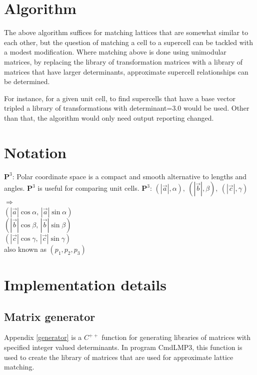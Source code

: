 \documentclass[preprint]{iucr}              %
\numberwithin{equation}{section}
\newcommand{\PIII}{\ensuremath{\mathbf{P}^{3}}}
\begin{document}
\section{Algorithm}

The above algorithm suffices for matching lattices that are somewhat
similar to each other, but the question of matching a cell to a supercell
can be tackled with a modest modification. Where matching above is
done using unimodular matrices, by replacing the library of transformation
matrices with a library  of matrices that have larger determinants, approximate
supercell relationships can be determined.

For instance, for a given unit cell, to find supercells that have 
a base vector tripled a library of transformations with 
determinant=3.0 would be used. Other than that, the algorithm 
would only need output reporting changed.
	
	\section{Notation}
	
\noindent \PIII{}: Polar coordinate space is a compact and smooth alternative to lengths and angles. \PIII{} is useful for comparing unit cells. \cite{andrews2026p3}
	\PIII{}: 
		$(|\vec{a}|,\alpha),\ (|\vec{b}|,\beta),\ (|\vec{c}|,\gamma)$\\
	$\Rightarrow$\\
	\hspace*{0.5cm}$(|\vec{a}|\cos\alpha,\, |\vec{a}|\sin\alpha)$\\
	\hspace*{0.5cm}$(|\vec{b}|\cos\beta,\, |\vec{b}|\sin\beta)$\\
	\hspace*{0.5cm}$(|\vec{c}|\cos\gamma,\, |\vec{c}|\sin\gamma)$\\
	also known as $(p_1, p_2, p_3)$


\section{Implementation details}

\subsection{Matrix generator}
Appendix \ref{generator} is a $C^{++}$ function for generating
libraries of matrices with specified integer valued determinants. In program CmdLMP3, this function is used
to create the library of matrices that are used for
approximate lattice matching.
\end{document}
